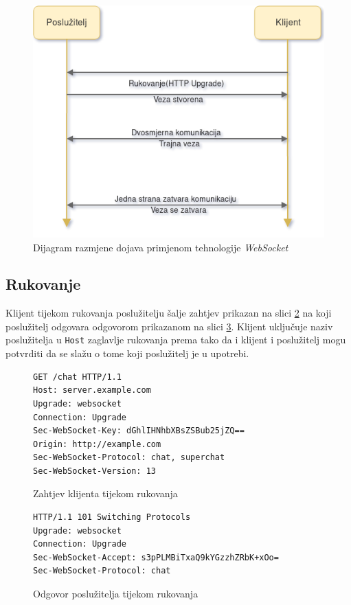 \documentclass[times, utf8, zavrsni]{fer}
\begin{document}
\begin{figure}[htb]
\centering
\includegraphics[width=14cm]{img/websocket.png}
\caption{Dijagram razmjene dojava primjenom tehnologije {\em WebSocket}}
\label{fig:websocket-image}
\end{figure}

\subsection{Rukovanje}
Klijent tijekom rukovanja poslužitelju šalje zahtjev prikazan na slici \ref{lst:websocket-rukovanje-1} na koji poslužitelj odgovara odgovorom prikazanom na slici \ref{lst:websocket-rukovanje-2}. Klijent uključuje naziv poslužitelja u {\tt Host} zaglavlje rukovanja prema tako da i klijent i poslužitelj mogu potvrditi da se slažu o tome koji poslužitelj je u upotrebi.

\begin{figure}
\begin{lstlisting}
GET /chat HTTP/1.1
Host: server.example.com
Upgrade: websocket
Connection: Upgrade
Sec-WebSocket-Key: dGhlIHNhbXBsZSBub25jZQ==
Origin: http://example.com
Sec-WebSocket-Protocol: chat, superchat
Sec-WebSocket-Version: 13
\end{lstlisting}
\caption{Zahtjev klijenta tijekom rukovanja}
\label{lst:websocket-rukovanje-1}
\end{figure}

\begin{figure}
\begin{lstlisting}
HTTP/1.1 101 Switching Protocols
Upgrade: websocket
Connection: Upgrade
Sec-WebSocket-Accept: s3pPLMBiTxaQ9kYGzzhZRbK+xOo=
Sec-WebSocket-Protocol: chat
\end{lstlisting}
\caption{Odgovor poslužitelja tijekom rukovanja}
\label{lst:websocket-rukovanje-2}
\end{figure}
\end{document}

